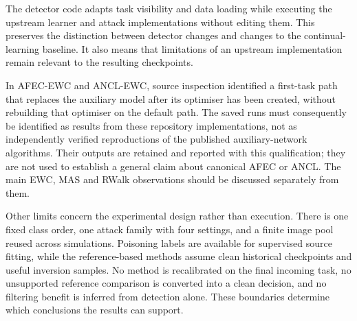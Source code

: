 The detector code adapts task visibility and data loading while executing
the upstream learner and attack implementations without editing them.
This preserves the distinction between detector changes and changes to
the continual-learning baseline. It also means that limitations of an
upstream implementation remain relevant to the resulting checkpoints.

In AFEC-EWC and ANCL-EWC, source inspection identified a first-task path
that replaces the auxiliary model after its optimiser has been created,
without rebuilding that optimiser on the default path. The saved runs
must consequently be identified as results from these repository
implementations, not as independently verified reproductions of the
published auxiliary-network algorithms. Their outputs are retained and
reported with this qualification; they are not used to establish a
general claim about canonical AFEC or ANCL. The main EWC, MAS and RWalk
observations should be discussed separately from them.

Other limits concern the experimental design rather than execution.
There is one fixed class order, one attack family with four settings,
and a finite image pool reused across simulations. Poisoning labels
are available for supervised source fitting, while the reference-based
methods assume clean historical checkpoints and useful inversion
samples. No method is recalibrated on the final incoming task, no
unsupported reference comparison is converted into a clean decision,
and no filtering benefit is inferred from detection alone. These
boundaries determine which conclusions the results can support.
